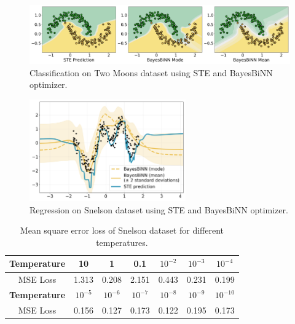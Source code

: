 \begin{figure}[h]
     \centering
         \includegraphics[width=1\textwidth]{../openreview/figs/TwoMoon.png}
         \caption{Classification on Two Moons dataset using STE and BayesBiNN optimizer.}
         \label{fig3}
\end{figure}

\begin{figure}[h]
     \centering
         \includegraphics[width=0.6\textwidth]{../openreview/figs/Snelson.png}
         \caption{Regression on Snelson dataset using STE and BayesBiNN optimizer.}
         \label{fig4}
\end{figure}


\begin{table}[h]
\begin{center}
\setlength{\tabcolsep}{12pt}
\renewcommand{\arraystretch}{1.3}
\begin{tabular}{ | c | c | c | c | c | c | c | }
\hline
 \textbf{Temperature} & 10 & 1 & 0.1 & $10^{-2}$ & $10^{-3}$ & $10^{-4}$ \\\hline
 MSE Loss & 1.313 & 0.208 & 2.151 & 0.443 & 0.231 & 0.199\\ \hline
 \textbf{Temperature} & $10^{-5}$ & $10^{-6}$ & $10^{-7}$ & $10^{-8}$ & $10^{-9}$ & $10^{-10}$\\  \hline
 MSE Loss & 0.156 & 0.127 & 0.173 & 0.122 & 0.195 & 0.173\\ 
\hline
\end{tabular}
\caption{Mean square error loss of Snelson dataset for different temperatures.}
\label{tab:Ablation_result_4}
\end{center}
\end{table}



